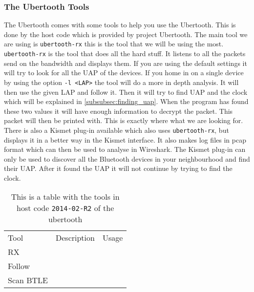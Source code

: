 \subsubsection{The Ubertooth Tools}
\label{subsubsec:ubertooth_tools}
The Ubertooth comes with some tools to help you use the Ubertooth. This is done by the host code which is provided by project Ubertooth. 
The main tool we are using is \verb|ubertooth-rx|  this is the tool that we will be using the most. \verb|ubertooth-rx| is the tool that does all the hard stuff. It listens to all the packets send on the bandwidth and displays them. If you are using the default settings it will try to look for all the UAP of the devices. If you home in on a single device by using the option \verb|-l <LAP>| the tool will do a more in depth analysis. It will then use the given LAP and follow it. Then it will try to find UAP and the clock which will be explained in \ref{subsubsec:finding_uap}. When the program has found these two values it will have enough information to decrypt the packet. This packet will then be printed with. This is exactly where what we are looking for. \pend There is also a Kismet plug-in available which also uses \verb|ubertooth-rx|, but displays it in a better way in the Kismet interface. It also makes log files in pcap format which can then be used to analyse in Wireshark. The Kismet plug-in can only be used to discover all the Bluetooth devices in your neighbourhood and find their UAP. After it found the UAP it will not continue by trying to find the clock.
\begin{table}
\begin{tabular}{|l|l|l|}
Tool & Description & Usage \\
RX \\
Follow \\ 
Scan 
BTLE

\end{tabular}
\caption{This is a table with the tools in host code \verb|2014-02-R2| of the ubertooth}
\label{tab:ubt_tool}
\end{table}

